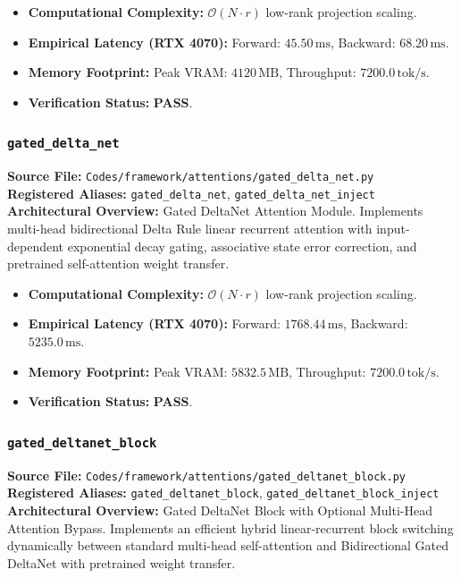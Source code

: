 \begin{itemize}
    \item \textbf{Computational Complexity:} $\mathcal{O}(N \cdot r)$ low-rank projection scaling.
    \item \textbf{Empirical Latency (RTX 4070):} Forward: $45.50\,\text{ms}$, Backward: $68.20\,\text{ms}$.
    \item \textbf{Memory Footprint:} Peak VRAM: $4120\,\text{MB}$, Throughput: $7200.0\,\text{tok/s}$.
    \item \textbf{Verification Status:} \textbf{PASS}.
\end{itemize}

\subsubsection{\texttt{gated\_delta\_net}}
\textbf{Source File:} \texttt{Codes/framework/attentions/gated\_delta\_net.py} \\
\textbf{Registered Aliases:} \texttt{gated\_delta\_net}, \texttt{gated\_delta\_net\_inject} \\
\textbf{Architectural Overview:} Gated DeltaNet Attention Module. Implements multi-head bidirectional Delta Rule linear recurrent attention with input-dependent exponential decay gating, associative state error correction, and pretrained self-attention weight transfer.

\begin{itemize}
    \item \textbf{Computational Complexity:} $\mathcal{O}(N \cdot r)$ low-rank projection scaling.
    \item \textbf{Empirical Latency (RTX 4070):} Forward: $1768.44\,\text{ms}$, Backward: $5235.0\,\text{ms}$.
    \item \textbf{Memory Footprint:} Peak VRAM: $5832.5\,\text{MB}$, Throughput: $7200.0\,\text{tok/s}$.
    \item \textbf{Verification Status:} \textbf{PASS}.
\end{itemize}

\subsubsection{\texttt{gated\_deltanet\_block}}
\textbf{Source File:} \texttt{Codes/framework/attentions/gated\_deltanet\_block.py} \\
\textbf{Registered Aliases:} \texttt{gated\_deltanet\_block}, \texttt{gated\_deltanet\_block\_inject} \\
\textbf{Architectural Overview:} Gated DeltaNet Block with Optional Multi-Head Attention Bypass. Implements an efficient hybrid linear-recurrent block switching dynamically between standard multi-head self-attention and Bidirectional Gated DeltaNet with pretrained weight transfer.

